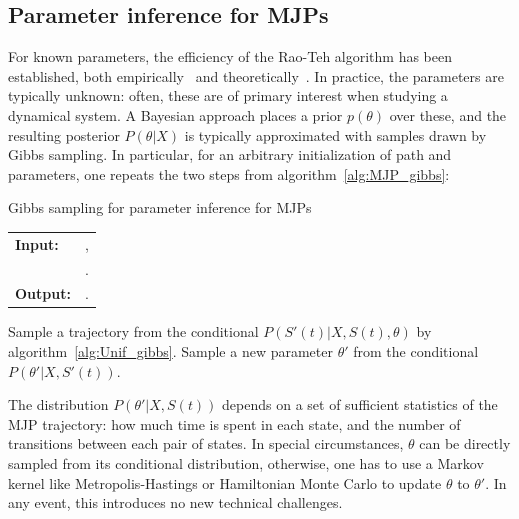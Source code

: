 \subsection{Parameter inference for MJPs}
For known parameters, the efficiency of the Rao-Teh algorithm has been 
established, both empirically~\citep{RaoTeh13} and theoretically~\citep{miasojedow2017}.
In practice, the parameters are typically unknown: often,
these are of primary interest when studying a dynamical
system. A Bayesian approach
places a prior $p(\theta)$ over these, and the
resulting posterior $P(\theta|X)$ is typically approximated
with samples drawn by Gibbs sampling. In particular, for an arbitrary 
initialization of path and  parameters, one repeats the
two steps from algorithm~\ref{alg:MJP_gibbs}:
\begin{algorithm}[H]
  \caption{Gibbs sampling for parameter inference for MJPs}
   \label{alg:MJP_gibbs}
  \begin{tabular}{l l}
   \textbf{Input:  } & \text{A set of partial and noisy observations $X$}, \\
                      & \text{The previous MJP path $S(t) = (S, T)$, the previous MJP parameters $\theta$}.\\ 
   \textbf{Output:  }& \text{A new MJP trajectory $S' (t) = (S', T')$, 
                            new MJP parameters $\theta'$}.\\
   \hline
   \end{tabular}
   \begin{algorithmic}[1]
  \State  Sample a trajectory from the conditional 
  $P(S'(t)|X,S(t),\theta)$ by 
  algorithm~\ref{alg:Unif_gibbs}.
  \State Sample a new parameter $\theta'$ from the conditional 
    $P(\theta'|X,S'(t))$.
   \end{algorithmic}
\end{algorithm} 
The distribution $P(\theta'|X,S(t))$ depends on a set of sufficient statistics of the 
MJP trajectory: how
much time is spent in each state, and the number of transitions
between each pair of states. 
In special circumstances, $\theta$ can be directly sampled from its 
conditional distribution, otherwise, one has to use a Markov kernel like
Metropolis-Hastings or Hamiltonian Monte Carlo to update $\theta$ to 
$\theta'$. In any event, this introduces no new technical challenges.
